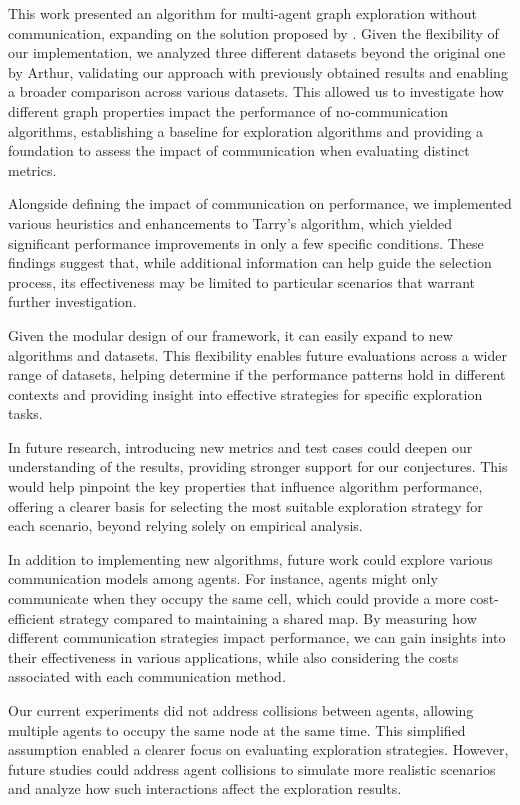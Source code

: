 This work presented an algorithm for multi-agent graph exploration without communication, expanding on the solution proposed by . Given the flexibility of our implementation, we analyzed three different datasets beyond the original one by Arthur, validating our approach with previously obtained results and enabling a broader comparison across various datasets. This allowed us to investigate how different graph properties impact the performance of no-communication algorithms, establishing a baseline for exploration algorithms and providing a foundation to assess the impact of communication when evaluating distinct metrics.

Alongside defining the impact of communication on performance, we implemented various heuristics and enhancements to Tarry's algorithm, which yielded significant performance improvements in only a few specific conditions. These findings suggest that, while additional information can help guide the selection process, its effectiveness may be limited to particular scenarios that warrant further investigation.

Given the modular design of our framework, it can easily expand to new algorithms and datasets. This flexibility enables future evaluations across a wider range of datasets, helping determine if the performance patterns hold in different contexts and providing insight into effective strategies for specific exploration tasks.

In future research, introducing new metrics and test cases could deepen our understanding of the results, providing stronger support for our conjectures. This would help pinpoint the key properties that influence algorithm performance, offering a clearer basis for selecting the most suitable exploration strategy for each scenario, beyond relying solely on empirical analysis.

In addition to implementing new algorithms, future work could explore various communication models among agents. For instance, agents might only communicate when they occupy the same cell, which could provide a more cost-efficient strategy compared to maintaining a shared map. By measuring how different communication strategies impact performance, we can gain insights into their effectiveness in various applications, while also considering the costs associated with each communication method. 

Our current experiments did not address collisions between agents, allowing multiple agents to occupy the same node at the same time. This simplified assumption enabled a clearer focus on evaluating exploration strategies. However, future studies could address agent collisions to simulate more realistic scenarios and analyze how such interactions affect the exploration results.

